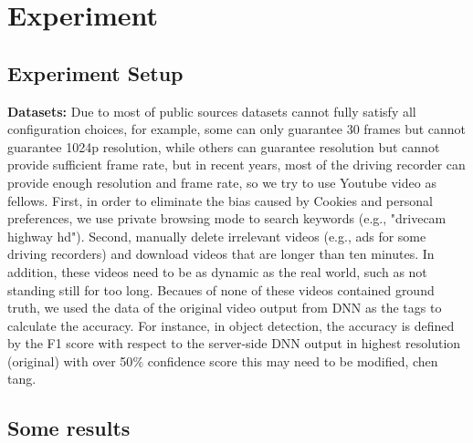 \section{Experiment}
\label{Section: experiment}

\subsection{Experiment Setup}
\textbf{Datasets:} Due to most of public sources datasets cannot fully satisfy all configuration choices, for example, some can only guarantee 30 frames but cannot guarantee 1024p resolution, while others can guarantee resolution but cannot provide sufficient frame rate, but in recent years, most of the driving recorder can provide enough resolution and frame rate, so we try to use Youtube video as fellows. First, in order to eliminate the bias caused by Cookies and personal preferences, we use private browsing mode to search keywords (e.g., "drivecam highway hd"). Second, manually delete irrelevant videos (e.g., ads for some driving recorders) and download videos that are longer than ten minutes. In addition, these videos need to be as dynamic as the real world, such as not standing still for too long. Becaues of none of these videos contained ground truth, we used the data of the original video output from DNN as the tags to calculate the accuracy. For instance, in object detection, the accuracy is defined by the F1 score with respect to the server-side DNN output in highest resolution (original) with over 50$\%$ confidence score \textcolor{note}{this may need to be modified, chen tang}.
\subsection{Some results}

